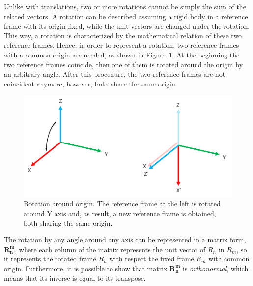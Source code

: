 Unlike with translations, two or more rotations cannot be simply the sum of the related vectors. A rotation can be described assuming a rigid body in a reference frame with its origin fixed, while the unit vectors are changed under the rotation. This way, a rotation is characterized by the mathematical relation of these two reference frames. Hence, in order to represent a rotation, two reference frames with a common origin are needed, as shown in Figure~\ref{fig:chapter1:transformation:rotation:3d-example}. At the beginning the two reference frames coincide, then one of them is rotated around the origin by an arbitrary angle. After this procedure, the two reference frames are not coincident anymore, however, both share the same origin.\\

\begin{figure}
    \centering
    \includegraphics[width=\textwidth]{Images/fig17-3D-rotation-example}
    \caption[Rotation around origin]{Rotation around origin. The reference frame at the left is rotated around Y axis and, as result, a new reference frame is obtained, both sharing the same origin.}
    \label{fig:chapter1:transformation:rotation:3d-example}
\end{figure}

The rotation by any angle around any axis can be represented in a matrix form, $\bm{R_n^m}$, where each column of the matrix represents the unit vector of $R_n$ in $R_m$, so it represents the rotated frame $R_n$ with respect the fixed frame $R_m$ with common origin. Furthermore, it is possible to show that matrix $\bm{R_n^m}$ is \emph{orthonormal}, which means that its inverse is equal to its transpose.\\

